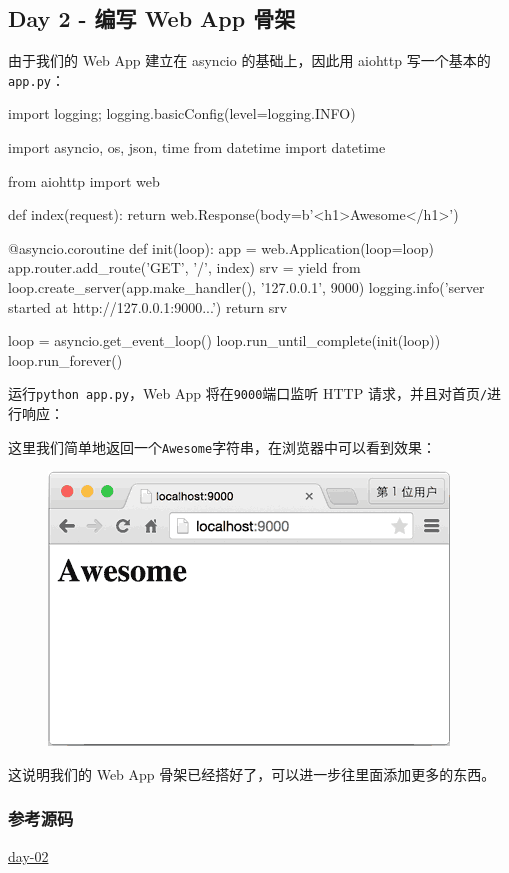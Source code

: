 \hypertarget{day-2---ux7f16ux5199-web-app-ux9aa8ux67b6}{%
\subsection{Day 2 - 编写 Web App
骨架}\label{day-2---ux7f16ux5199-web-app-ux9aa8ux67b6}}

由于我们的 Web App 建立在 asyncio 的基础上，因此用 aiohttp
写一个基本的\texttt{app.py}：

\begin{pythoncode}
import logging; logging.basicConfig(level=logging.INFO)

import asyncio, os, json, time
from datetime import datetime

from aiohttp import web

def index(request):
    return web.Response(body=b'<h1>Awesome</h1>')

@asyncio.coroutine
def init(loop):
    app = web.Application(loop=loop)
    app.router.add_route('GET', '/', index)
    srv = yield from loop.create_server(app.make_handler(), '127.0.0.1', 9000)
    logging.info('server started at http://127.0.0.1:9000...')
    return srv

loop = asyncio.get_event_loop()
loop.run_until_complete(init(loop))
loop.run_forever()
\end{pythoncode}

运行\texttt{python\ app.py}，Web App 将在\texttt{9000}端口监听 HTTP
请求，并且对首页\texttt{/}进行响应：


这里我们简单地返回一个\texttt{Awesome}字符串，在浏览器中可以看到效果：

 
 \begin{figure}[htp]
	\centering
	\includegraphics[width=0.6\linewidth]{fig/1019401123918240l.png}
\end{figure}


这说明我们的 Web App 骨架已经搭好了，可以进一步往里面添加更多的东西。

\hypertarget{ux53c2ux8003ux6e90ux7801}{%
\subsubsection{参考源码}\label{ux53c2ux8003ux6e90ux7801}}

\href{https://github.com/michaelliao/awesome-python3-webapp/tree/day-02}{day-02}

